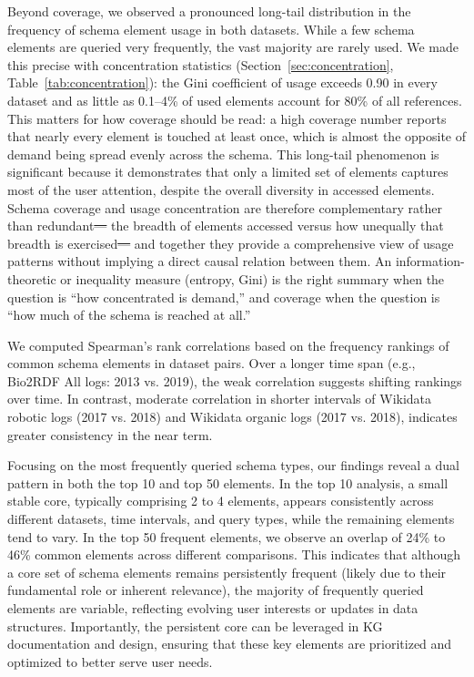 \documentclass[sw]{iosart2x}
\providecommand{\DIFadd}[1]{{\protect\color{blue}\uwave{#1}}} %
\providecommand{\DIFdel}[1]{{\protect\color{red}\sout{#1}}} %
\providecommand{\DIFaddbegin}{} %
\providecommand{\DIFaddend}{} %
\providecommand{\DIFdelbegin}{} %
\providecommand{\DIFdelend}{} %
\providecommand{\DIFscaledelfig}{0.5}
\newlength{\DIFdelgraphicswidth} %
\newlength{\DIFdelgraphicsheight} %
\providecommand{\DIFaddincludegraphics}[2][]{{\color{blue}\fbox{\DIFOincludegraphics[#1]{#2}}}} %
\providecommand{\DIFdelincludegraphics}[2][]{%
\sbox{\DIFdelgraphicsbox}{\DIFOincludegraphics[#1]{#2}}%
\settoboxwidth{\DIFdelgraphicswidth}{\DIFdelgraphicsbox} %
\settoboxtotalheight{\DIFdelgraphicsheight}{\DIFdelgraphicsbox} %
\scalebox{\DIFscaledelfig}{%
\parbox[b]{\DIFdelgraphicswidth}{\usebox{\DIFdelgraphicsbox}\\[-\baselineskip] \rule{\DIFdelgraphicswidth}{0em}}\llap{\resizebox{\DIFdelgraphicswidth}{\DIFdelgraphicsheight}{%
\setlength{\unitlength}{\DIFdelgraphicswidth}%
\begin{picture}(1,1)%
\thicklines\linethickness{2pt} %
{\color[rgb]{1,0,0}\put(0,0){\framebox(1,1){}}}%
{\color[rgb]{1,0,0}\put(0,0){\line( 1,1){1}}}%
{\color[rgb]{1,0,0}\put(0,1){\line(1,-1){1}}}%
\end{picture}%
}\hspace*{3pt}}} %
} %
\DeclareRobustCommand{\DIFaddbegin}{\DIFOaddbegin \let\includegraphics\DIFaddincludegraphics} %
\DeclareRobustCommand{\DIFaddend}{\DIFOaddend \let\includegraphics\DIFOincludegraphics} %
\DeclareRobustCommand{\DIFdelbegin}{\DIFOdelbegin \let\includegraphics\DIFdelincludegraphics} %
\DeclareRobustCommand{\DIFdelend}{\DIFOaddend \let\includegraphics\DIFOincludegraphics} %
\begin{document}
Beyond coverage, we observed a pronounced long-tail distribution in the frequency of schema element usage in both datasets. While a few schema elements are queried very frequently, the vast majority are rarely used. We made this precise with concentration statistics (Section~\ref{sec:concentration}, Table~\ref{tab:concentration}): the Gini coefficient of usage exceeds 0.90 in every dataset and as little as 0.1--4\% of used elements account for 80\% of all references. This matters for how coverage should be read: a high coverage number reports that nearly every element is touched at least once, which is almost the opposite of demand being spread evenly across the schema. This long-tail phenomenon is significant because it demonstrates that only a limited set of elements captures most of the user attention, despite the overall diversity in accessed elements. Schema coverage and usage concentration are therefore complementary rather than redundant\DIFdelbegin \DIFdel{--- }\DIFdelend \DIFaddbegin \DIFadd{, }\DIFaddend the breadth of elements accessed versus how unequally that breadth is exercised\DIFdelbegin \DIFdel{--- }\DIFdelend \DIFaddbegin \DIFadd{, }\DIFaddend and together they provide a comprehensive view of usage patterns without implying a direct causal relation between them. An information-theoretic or inequality measure (entropy, Gini) is the right summary when the question is ``how concentrated is demand,'' and coverage when the question is ``how much of the schema is reached at all.''

We computed Spearman’s rank correlations based on the frequency rankings of common schema elements in dataset pairs. Over a longer time span (e.g., Bio2RDF All logs: 2013 vs. 2019), the weak correlation suggests shifting rankings over time. In contrast, moderate correlation in shorter intervals of Wikidata robotic logs (2017 vs. 2018) and Wikidata organic logs (2017 vs. 2018), indicates greater consistency in the near term.

Focusing on the most frequently queried schema types, our findings reveal a dual pattern in both the top 10 and top 50 elements. In the top 10 analysis, a small stable core, typically comprising 2 to 4 elements, appears consistently across different datasets, time intervals, and query types, while the remaining elements tend to vary. In the top 50 frequent elements, we observe an overlap of 24\% to 46\% common elements across different comparisons. This indicates that although a core set of schema elements remains persistently frequent (likely due to their fundamental role or inherent relevance), the majority of frequently queried elements are variable, reflecting evolving user interests or updates in data structures. Importantly, the persistent core can be leveraged in KG documentation and design, ensuring that these key elements are prioritized and optimized to better serve user needs.
\end{document}
